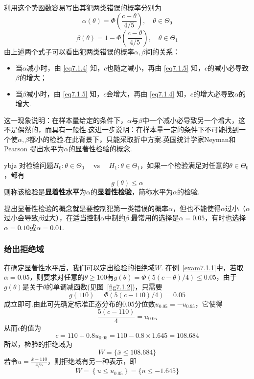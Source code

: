 利用这个势函数容易写出其犯两类错误的概率分别为
\begin{equation}\label{eq7.1.4}
\alpha\left(\theta\right)=\Phi\left(\frac{c-\theta}{4/5}\right),\quad\theta\in\Theta_0
\end{equation}
\begin{equation}\label{eq7.1.5}
\beta\left(\theta\right)=1-\Phi\left(\frac{c-\theta}{4/5}\right),\quad\theta\in\Theta_1
\end{equation}
由上述两个式子可以看出犯两类错误的概率$\alpha,\beta$间的关系：
\begin{itemize}
	\item 当$\alpha$减小时，由 \eqref{eq7.1.4} 知，$c$也随之减小，再由 \eqref{eq7.1.5} 知，$c$的减小必导致$\beta$的增大；
	\item 当$\beta$减小时，由 \eqref{eq7.1.5} 知，$c$会增大，再由 \eqref{eq7.1.4} 知，$c$的增大必导致$\alpha$的增大.
	
\end{itemize}

这一现象说明：在样本量给定的条件下，$\alpha$与$\beta$中一个减小必导致另一个增大，这不是偶然的，而具有一般性.这进一步说明：在样本量一定的条件下不可能找到一个使$\alpha,\beta$都小的检验.在此背景下，只能采取折中方案.英国统计学家Neyman和Pearson 提出水平为$\alpha$的显著性检验的概念.
\begin{definition}{}{ybjz}
	对检验问题$H _ { 0 } : \theta \in \Theta _ { 0 } \quad \text { vs } \quad H _ { 1 } : \theta \in \Theta _ { 1 }$，如果一个检验满足对任意的$\theta \in \Theta _ { 0 }$，都有
	\[g ( \theta ) \leq \alpha\]
	则称该检验是\textbf{显着性水平}为$\alpha$的\textbf{显着性检验}，简称水平为$\alpha$的检验.
\end{definition}
提出显著性检验的概念就是要控制犯第一类错误的概率$\alpha$，但也不能使得$\alpha$过小（$\alpha$过小会导致$\beta$过大），在适当控制$\alpha$中制约$\beta$.最常用的选择是$\alpha=0.05$，有时也选择$\alpha=0.10$或$\alpha=0.01$.

\subsubsection{给出拒绝域}

在确定显著性水平后，我们可以定出检验的拒绝域$W$. 在例~\ref{exam7.1.1}中，若取$\alpha=0.05$，则要求对任意的$\theta\geq 100$有$g ( \theta ) = \Phi ( 5 ( c - \theta ) / 4 ) \leq 0.05$，由于$g(\theta)$是关于$\theta$的单调减函数(见图~\ref{fig7.1.2})，只需要
\[g ( 110 ) = \Phi ( 5 ( c - 110 ) / 4 ) = 0.05\]
成立即可.由此可先确定标准正态分布的0.05分位数$u _ { 0.05 } = - u _ { 0.95 }$，它使得
\[\frac { 5 ( c - 110 ) } { 4 } = u _ { 0.05 }\]
从而$c$的值为
\[c = 110 + 0.8 u _ { 0.05 } = 110 - 0.8 \times 1.645 = 108.684\]
所以，检验的拒绝域为
\[W = \{\overline { x } \leq 108.684 \}\]
若令$u = \frac { \overline { x } - 110 } { 4 / 5 }$，则拒绝域有另一种表示，即
\[W = \left\{ u \leq u _ { 0.05 } \right\} = \{ u \leq - 1.645 \}\]

